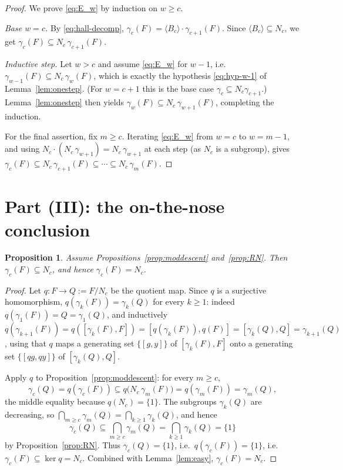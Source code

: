\documentclass{amsart}
\newtheorem{proposition}{Proposition}
\theoremstyle{definition}
\theoremstyle{remark}
\begin{document}
\begin{proof}
We prove \eqref{eq:E_w} by induction on $w\ge c$.

\emph{Base $w=c$.} By \eqref{eq:hall-decomp},
$\gamma_c(F)=\langle B_c\rangle\cdot\gamma_{c+1}(F)$. Since
$\langle B_c\rangle\subseteq N_c$, we get
$\gamma_c(F)\subseteq N_c\,\gamma_{c+1}(F)$.

\emph{Inductive step.} Let $w>c$ and assume \eqref{eq:E_w} for $w-1$, i.e.\
$\gamma_{w-1}(F)\subseteq N_c\,\gamma_{w}(F)$, which is exactly the hypothesis
\eqref{eq:hyp-w-1} of Lemma~\ref{lem:onestep}. (For $w=c+1$ this is the base case
$\gamma_c\subseteq N_c\gamma_{c+1}$.) Lemma~\ref{lem:onestep} then yields
$\gamma_w(F)\subseteq N_c\,\gamma_{w+1}(F)$, completing the induction.

For the final assertion, fix $m\ge c$. Iterating \eqref{eq:E_w} from $w=c$ to
$w=m-1$, and using $N_c\cdot(N_c\,\gamma_{w+1})=N_c\,\gamma_{w+1}$ at each step
(as $N_c$ is a subgroup), gives
$\gamma_c(F)\subseteq N_c\,\gamma_{c+1}(F)\subseteq\cdots\subseteq N_c\,\gamma_m(F)$.
\end{proof}

\section{Part (III): the on-the-nose conclusion}\label{sec:final}

\begin{proposition}\label{prop:final}
Assume Propositions~\ref{prop:moddescent} and~\ref{prop:RN}. Then
$\gamma_c(F)\subseteq N_c$, and hence $\gamma_c(F)=N_c$.
\end{proposition}

\begin{proof}
Let $q\colon F\to Q:=F/N_c$ be the quotient map. Since $q$ is a surjective
homomorphism, $q(\gamma_k(F))=\gamma_k(Q)$ for every $k\ge1$: indeed
$q(\gamma_1(F))=Q=\gamma_1(Q)$, and inductively
$q(\gamma_{k+1}(F))=q([\gamma_k(F),F])=[q(\gamma_k(F)),q(F)]=[\gamma_k(Q),Q]
=\gamma_{k+1}(Q)$, using that $q$ maps a generating set $\{[g,y]\}$ of
$[\gamma_k(F),F]$ onto a generating set $\{[q g,q y]\}$ of $[\gamma_k(Q),Q]$.

Apply $q$ to Proposition~\ref{prop:moddescent}: for every $m\ge c$,
\[
\gamma_c(Q)=q(\gamma_c(F))\subseteq q\big(N_c\,\gamma_m(F)\big)
=q(\gamma_m(F))=\gamma_m(Q),
\]
the middle equality because $q(N_c)=\{1\}$. The subgroups $\gamma_k(Q)$ are
decreasing, so $\bigcap_{m\ge c}\gamma_m(Q)=\bigcap_{k\ge1}\gamma_k(Q)$, and hence
\[
\gamma_c(Q)\subseteq\bigcap_{m\ge c}\gamma_m(Q)=\bigcap_{k\ge1}\gamma_k(Q)=\{1\}
\]
by Proposition~\ref{prop:RN}. Thus $\gamma_c(Q)=\{1\}$, i.e.\
$q(\gamma_c(F))=\{1\}$, i.e.\ $\gamma_c(F)\subseteq\ker q=N_c$. Combined with
Lemma~\ref{lem:easy}, $\gamma_c(F)=N_c$.
\end{proof}
\end{document}
